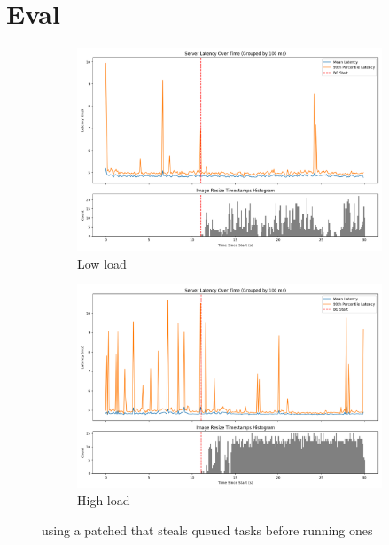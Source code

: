 \section{Eval}
\label{s:eval}


\begin{figure}[t]
    \centering
    \begin{subfigure}[t]{0.49\columnwidth}
        \includegraphics[width=\columnwidth]{graphs/patched-idle-low-two.png}
        \caption{Low load}\label{fig:patched-idle-low-two}
    \end{subfigure}
    \hspace{\fill}
    \begin{subfigure}[t]{0.49\columnwidth}
        \includegraphics[width=\columnwidth]{graphs/patched-idle-high-two.png}
        \caption{High load}\label{fig:patched-idle-high-two}
    \end{subfigure}
    \vspace{4pt}
    \caption{using a patched \schedidle{} that steals queued \schednormal{}
    tasks before running \schedidle{} ones}\label{fig:patched-idle}
\end{figure}

